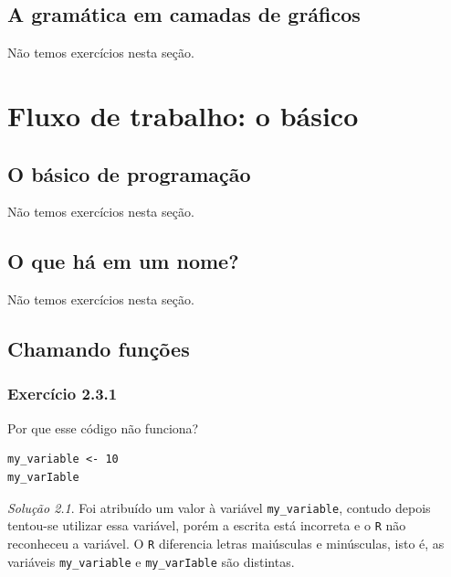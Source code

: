 \documentclass[
]{latex/krantz}
\theoremstyle{definition}
\theoremstyle{definition}
\theoremstyle{definition}
\theoremstyle{definition}
\theoremstyle{remark}
\newtheorem*{solution}{Solução}
\begin{document}
\hypertarget{a-gramuxe1tica-em-camadas-de-gruxe1ficos}{%
\section{A gramática em camadas de gráficos}\label{a-gramuxe1tica-em-camadas-de-gruxe1ficos}}

Não temos exercícios nesta seção.

\hypertarget{fluxo-de-trabalho-o-buxe1sico}{%
\chapter{Fluxo de trabalho: o básico}\label{fluxo-de-trabalho-o-buxe1sico}}

\hypertarget{o-buxe1sico-de-programauxe7uxe3o}{%
\section{O básico de programação}\label{o-buxe1sico-de-programauxe7uxe3o}}

Não temos exercícios nesta seção.

\hypertarget{o-que-huxe1-em-um-nome}{%
\section{O que há em um nome?}\label{o-que-huxe1-em-um-nome}}

Não temos exercícios nesta seção.

\hypertarget{chamando-funuxe7uxf5es}{%
\section{Chamando funções}\label{chamando-funuxe7uxf5es}}

\hypertarget{exr2-3-1}{%
\subsection*{Exercício 2.3.1}\label{exr2-3-1}}

Por que esse código não funciona?

\begin{verbatim}
my_variable <- 10
my_varIable
\end{verbatim}

\begin{solution}
Foi atribuído um valor à variável \texttt{my\_variable}, contudo depois tentou-se utilizar essa variável, porém a escrita está incorreta e o \texttt{R} não reconheceu a variável.
O \texttt{R} diferencia letras maiúsculas e minúsculas, isto é, as variáveis \texttt{my\_variable} e \texttt{my\_varIable} são distintas.
\end{solution}
\end{document}
